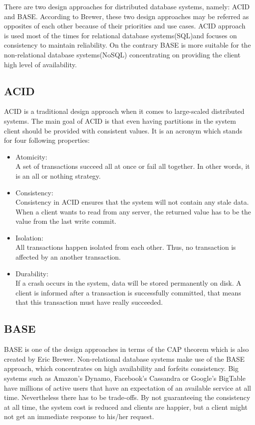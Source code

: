There are two design approaches for distributed database systems, namely: ACID and BASE. According to Brewer, these two design approaches may be referred as opposites of each other because of their priorities and use cases.  ACID approach is used most of the times for relational database systems(SQL)and focuses on consistency to maintain reliability. On the contrary BASE is more suitable for the non-relational database systems(NoSQL) concentrating on providing the client high level of availability.

\subsection{ACID}
\label{sec:backgorund_acid}
ACID is a traditional design approach when it comes to large-scaled distributed systems. The main goal of ACID is that even having partitions in the system client should be provided with consistent values. It is an acronym which stands for four following properties:
\begin{itemize}
\item Atomicity:\\
A set of transactions succeed all at once or fail all together. In other words, it is an all or nothing strategy.
\item Consistency:\\
Consistency in ACID ensures that the system will not contain any stale data. When a client wants to read from any server, the returned value has to be the value from the last write commit.
\item Isolation:\\
All transactions happen isolated from each other. Thus, no transaction is affected by an another transaction.
\item Durability:\\
If a crash occurs in the system, data will be stored permanently on disk. A client is informed after a transaction is successfully committed, that means that this transaction must have really succeeded.  
\end{itemize} 

\subsection{BASE}
\label{sec:backgorund_base}
BASE is one of the design approaches in terms of the CAP theorem which is also created by Eric Brewer. Non-relational database systems make use of the BASE approach, which concentrates on high availability and forfeits consistency. Big systems such as Amazon's Dynamo, Facebook's Cassandra or Google's BigTable have millions of active users that have an expectation of an available service at all time. Nevertheless there has to be trade-offs. By not guaranteeing the consistency at all time, the system cost is reduced and clients are happier, but a client might not get an immediate response to his/her request.

